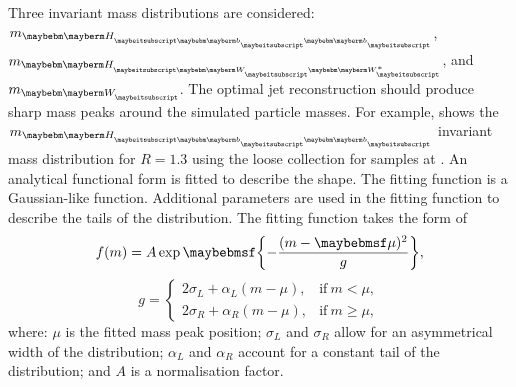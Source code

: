 

Three invariant mass distributions are considered:  $m_{\Hbb}$, $m_{\HWW}$, and $m_{\PW}$. The optimal jet reconstruction should produce sharp mass peaks around the simulated particle masses. For example,  shows the $m_{\Hbb}$ invariant mass distribution for $R = 1.3$ using the loose \PFO collection for samples at . An analytical functional form is fitted to describe the shape. The fitting function is a Gaussian-like function. Additional parameters are used in the fitting function to describe the tails of the  distribution. The fitting function takes the form of
\begin{equation}
f(m)=A \exp\braces{- \frac{(m - \mu)^2}{g}},
\end{equation}
\begin{equation}
g=
\begin{cases}
2\sigma_L + \alpha_L(m - \mu), & \text{if}\ m < \mu,\\
2\sigma_R + \alpha_R(m - \mu), & \text{if}\ m \geqslant \mu,
\end{cases}
\end{equation}
where: $\mu$ is the fitted mass peak position; $\sigma_L$ and $\sigma_R$ allow for an asymmetrical width of the distribution; $\alpha_L$ and  $\alpha_R$  account for a constant tail of the distribution; and $A$ is a normalisation factor.


